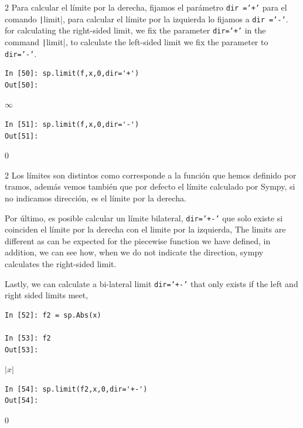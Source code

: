 \begin{paracol}{2}
Para calcular el límite por la derecha, fijamos el parámetro \texttt{dir ='+'} para el comando \texttt|limit|, para calcular el límite por la izquierda lo fijamos a \texttt{dir ='-'}.
\switchcolumn
for calculating the right-sided limit, we fix the parameter \texttt{dir='+'} in the command \texttt|limit|, to calculate the left-sided limit we fix the parameter to \texttt{dir='-'}.
\end{paracol}
\begin{center}
	\begin{minipage}{.6\textwidth}
		\begin{verbatim}
In [50]: sp.limit(f,x,0,dir='+')
Out[50]: 
		\end{verbatim}
		$\infty$
		\begin{verbatim}
In [51]: sp.limit(f,x,0,dir='-')
Out[51]: 
\end{verbatim}
$0$
\end{minipage}
\end{center}
\begin{paracol}{2}
Los límites son distintos como corresponde a la función que hemos definido por tramos, además vemos también que por defecto el límite calculado por Sympy, si no indicamos dirección, es el límite por la derecha.

Por último, es posible calcular un límite bilateral, \texttt{dir='+-'} que solo existe si coinciden el límite por la derecha con el limite por la izquierda,
\switchcolumn
The limits are different as can be expected for the piecewise function we have defined, in addition, we can see how, when we do not indicate the direction, sympy calculates the right-sided limit.

Lastly, we can calculate a bi-lateral limit \texttt{dir='+-'} that only exists if the left and right sided limits meet,
\end{paracol}
\begin{center}
	\begin{minipage}{.6\textwidth}
		\begin{verbatim}
In [52]: f2 = sp.Abs(x)

In [53]: f2
Out[53]: 		\end{verbatim}
		$|x|$
		\begin{verbatim}
In [54]: sp.limit(f2,x,0,dir='+-')
Out[54]: 
		\end{verbatim}
		$0$
		
	\end{minipage}
\end{center}

